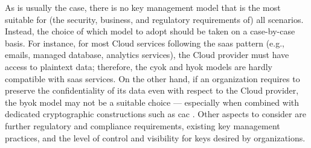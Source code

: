 As is usually the case, there is no key management model that is the most suitable for (the security, business, and regulatory requirements of) all scenarios. Instead, the choice of which model to adopt should be taken on a case-by-case basis. For instance, for most Cloud services following the \gls{saas} pattern (e.g., emails, managed database, analytics services), the Cloud provider must have access to plaintext data; therefore, the \gls{cyok} and \gls{hyok} models are hardly compatible with \gls{saas} services. On the other hand, if an organization requires to preserve the confidentiality of its data even with respect to the Cloud provider, the \gls{byok} model may not be a suitable choice --- especially when combined with dedicated cryptographic constructions such as \gls{cac} \cite{berlato_formal_2022,berlato_end_2022}. Other aspects to consider are further regulatory and compliance requirements, existing key management practices, and the level of control and visibility for keys desired by organizations.

